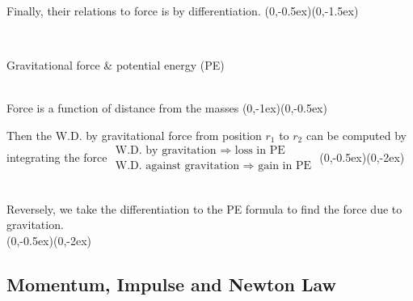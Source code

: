 \documentclass[class=article, crop=false, 12pt]{standalone}
\begin{document}
\hfill\\[1em]
Finally, their relations to force is by differentiation.
{(0,-0.5ex)}{(0,-1.5ex)}

\hfill\\
\begin{example} Gravitational force \& potential energy (PE)

    \\
    {Force is a function of distance from the masses}
    {(0,-1ex)}{(0,-0.5ex)}
    
    Then the W.D. by gravitational force from position $r_1$ to $r_2$ can be computed by integrating the force
    {$\substack{\displaystyle\text{W.D. by gravitation } \Rightarrow \text{ loss in PE} \\ \displaystyle\text{W.D. against gravitation }\Rightarrow \text{ gain in PE}}$}
    {(0,-0.5ex)}{(0,-2ex)}

    \hfill\\[1em]
    Reversely, we take the  differentiation to the PE formula to find the force due to gravitation.
    \\
    {(0,-0.5ex)}{(0,-2ex)}

\end{example}

\newpage
\subsection{Momentum, Impulse and Newton  Law}
\end{document}
